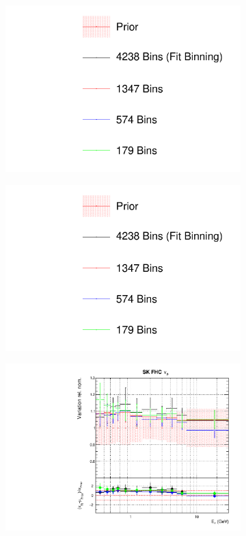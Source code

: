 \begin{figure}[t]
\centering
\begin{subfigure}{0.3\textwidth}
  \centering
  \includegraphics[width=0.8\linewidth, trim={5mm  65mm 0mm 0mm}, clip]{figs/detcovbin_leg}
\end{subfigure}
\begin{subfigure}{0.3\textwidth}
  \centering
  \includegraphics[width=0.8\linewidth, trim={5mm  0mm 0mm 105mm}, clip]{figs/detcovbin_leg}
\end{subfigure}
\begin{subfigure}{0.45\textwidth}
  \centering
  \includegraphics[width=0.75\linewidth]{figs/detcovbinflux_8}

\end{subfigure}
\end{figure}
